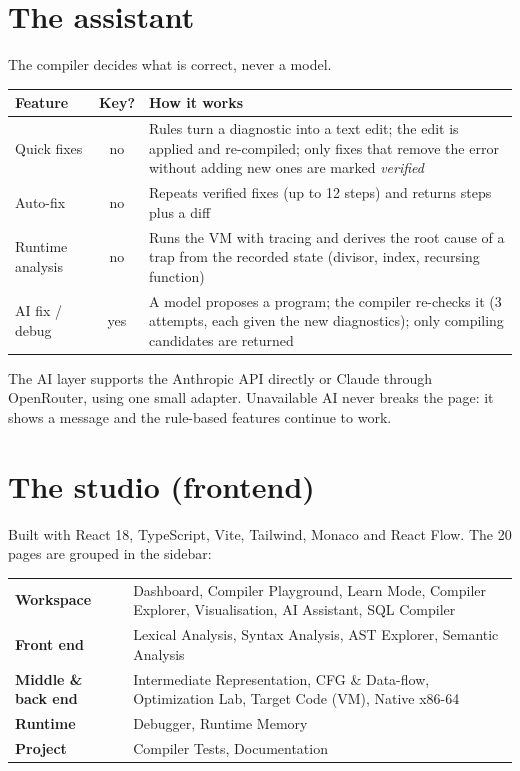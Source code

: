 \documentclass[11pt,a4paper]{article}
\begin{document}
\section{The assistant}
\begin{aim}[Principle]
The compiler decides what is correct, never a model.
\end{aim}
\begin{center}\small
\begin{tabularx}{\linewidth}{@{}l c X@{}}\toprule
Feature&Key?&How it works\\\midrule
Quick fixes&no&Rules turn a diagnostic into a text edit; the edit is applied and re-compiled; only fixes that remove the error without adding new ones are marked \emph{verified}\\
Auto-fix&no&Repeats verified fixes (up to 12 steps) and returns steps plus a diff\\
Runtime analysis&no&Runs the VM with tracing and derives the root cause of a trap from the recorded state (divisor, index, recursing function)\\
AI fix / debug&yes&A model proposes a program; the compiler re-checks it (3 attempts, each given the new diagnostics); only compiling candidates are returned\\\bottomrule
\end{tabularx}
\end{center}
The AI layer supports the Anthropic API directly or Claude through OpenRouter, using one small adapter. Unavailable AI never breaks the page: it shows a message and the rule-based features continue to work.

\section{The studio (frontend)}
Built with React 18, TypeScript, Vite, Tailwind, Monaco and React Flow. The 20 pages are grouped in the sidebar:
\begin{center}\small
\begin{tabularx}{\linewidth}{@{}>{\bfseries\sffamily\color{indigo}}l X@{}}\toprule
Workspace&Dashboard, Compiler Playground, Learn Mode, Compiler Explorer, Visualisation, AI Assistant, SQL Compiler\\
Front end&Lexical Analysis, Syntax Analysis, AST Explorer, Semantic Analysis\\
Middle \& back end&Intermediate Representation, CFG \& Data-flow, Optimization Lab, Target Code (VM), Native x86-64\\
Runtime&Debugger, Runtime Memory\\
Project&Compiler Tests, Documentation\\\bottomrule
\end{tabularx}
\end{center}
\end{document}

